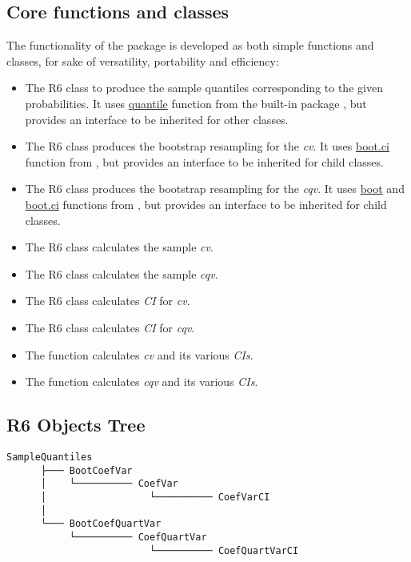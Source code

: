 \subsection{Core functions and classes}\label{core-functions-and-classes}

The functionality of the package is developed as both simple functions and  classes, for sake of versatility, portability and efficiency:

\begin{itemize}
\tightlist
\item
  The R6 class  to produce the sample quantiles corresponding to the given probabilities. It uses \href{https://stat.ethz.ch/R-manual/R-devel/library/stats/html/quantile.html}{quantile} function from the built-in  package , but provides an  interface to be inherited for other classes.
\item
  The R6 class  produces the bootstrap resampling for the \emph{cv}. It uses \href{https://stat.ethz.ch/R-manual/R-patched/library/boot/html/boot.ci.html}{boot.ci} function from , but provides an  interface to be inherited for child classes.
\item
  The R6 class  produces the bootstrap resampling for the \emph{cqv}. It uses \href{https://stat.ethz.ch/R-manual/R-patched/library/boot/html/boot.html}{boot} and \href{https://stat.ethz.ch/R-manual/R-patched/library/boot/html/boot.ci.html}{boot.ci} functions from , but provides an  interface to be inherited for child classes.
\item
  The R6 class  calculates the sample \emph{cv}.
\item
  The R6 class  calculates the sample \emph{cqv}.
\item
  The R6 class  calculates \emph{CI} for \emph{cv}.
\item
  The R6 class  calculates \emph{CI} for \emph{cqv}.
\item
  The function  calculates \emph{cv} and its various \emph{CIs}.
\item
  The function  calculates \emph{cqv} and its various \emph{CIs}.
\end{itemize}

\subsection{R6 Objects Tree}
\begin{verbatim}
SampleQuantiles
      ├─── BootCoefVar
      │    └────────── CoefVar
      │                  └────────── CoefVarCI
      │  
      └─── BootCoefQuartVar
           └────────── CoefQuartVar
                         └────────── CoefQuartVarCI
\end{verbatim}

